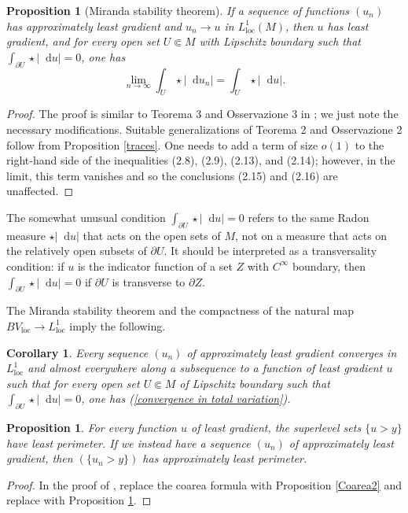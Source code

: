 \documentclass[reqno,12pt,letterpaper]{amsart}
\newcommand*\dif{\mathop{}\!\mathrm{d}}
\newcommand{\loc}{\mathrm{loc}}
\newtheorem{proposition}[theorem]{Proposition}
\newtheorem{corollary}[theorem]{Corollary}
\theoremstyle{definition}
\numberwithin{equation}{section}
\begin{document}
\begin{proposition}[Miranda stability theorem]\label{Miranda convergence}
If a sequence of functions $(u_n)$ has approximately least gradient and $u_n \to u$ in $L^1_\loc(M)$, then $u$ has least gradient, and for every open set $U \Subset M$ with Lipschitz boundary such that $\int_{\partial U} \star |\dif u| = 0$, one has
\begin{equation}\label{convergence in total variation}
\lim_{n \to \infty} \int_U \star |\dif u_n| = \int_U \star |\dif u|.
\end{equation}
\end{proposition}
\begin{proof}
The proof is similar to Teorema 3 and Osservazione 3 in \cite{Miranda67}; we just note the necessary modifications.
Suitable generalizations of Teorema 2 and Osservazione 2 follow from Proposition \ref{traces}.
One needs to add a term of size $o(1)$ to the right-hand side of the inequalities (2.8), (2.9), (2.13), and (2.14); however, in the limit, this term vanishes and so the conclusions (2.15) and (2.16) are unaffected.
\end{proof}

The somewhat unusual condition $\int_{\partial U} \star |\dif u| = 0$ refers to the same Radon measure $\star |\dif u|$ that acts on the open sets of $M$, not on a measure that acts on the relatively open subsets of $\partial U$.
It should be interpreted as a transversality condition: if $u$ is the indicator function of a set $Z$ with $C^\infty$ boundary, then $\int_{\partial U} \star |\dif u| = 0$ if $\partial U$ is transverse to $\partial Z$.

The Miranda stability theorem and the compactness of the natural map $BV_\loc \to L^1_\loc$ imply the following.

\begin{corollary}\label{compactness}
Every sequence $(u_n)$ of approximately least gradient converges in $L^1_\loc$ and almost everywhere along a subsequence to a function of least gradient $u$ such that for every open set $U \Subset M$ of Lipschitz boundary such that $\int_{\partial U} \star |\dif u| = 0$, one has (\ref{convergence in total variation}).
\end{corollary}

\begin{proposition}\label{level sets are minimal}
For every function $u$ of least gradient, the superlevel sets $\{u > y\}$ have least perimeter.
If we instead have a sequence $(u_n)$ of approximately least gradient, then $(\{u_n > y\})$ has approximately least perimeter.
\end{proposition}
\begin{proof}
In the proof of \cite[Theorem 1]{BOMBIERI1969}, replace the coarea formula \cite[Theorem 1.6]{Miranda66} with Proposition \ref{Coarea2} and replace \cite[Teorema 3]{Miranda67} with Proposition \ref{Miranda convergence}.
\end{proof}
\end{document}
